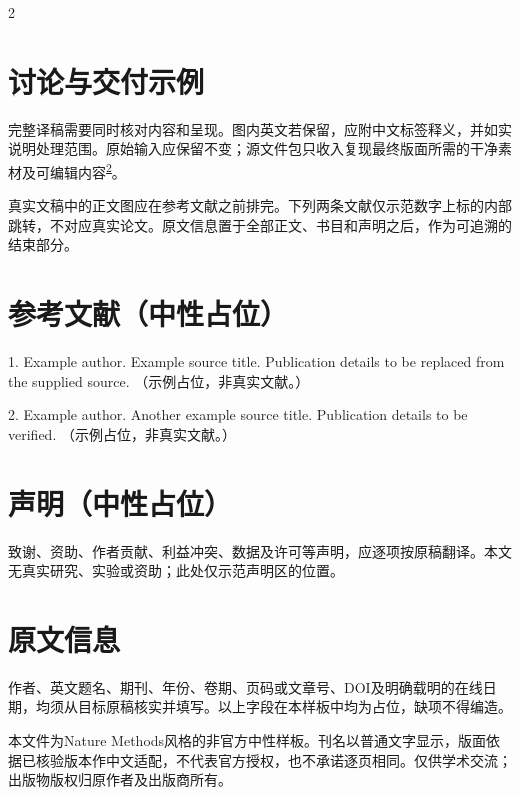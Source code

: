 \documentclass[UTF8,fontset=none,scheme=plain]{ctexart}
\newcommand{\MethodsCite}[1]{\textsuperscript{\hyperlink{ref:#1}{#1}}}
\newenvironment{methodscols}{\begin{multicols}{2}}{\end{multicols}}
\begin{document}
\clearpage
\begin{center}\begin{minipage}{.78\textwidth}\DemoVector\end{minipage}\end{center}
\par\vspace{11bp}
\begin{methodscols}
\section*{讨论与交付示例}
完整译稿需要同时核对内容和呈现。图内英文若保留，应附中文标签释义，并如实说明处理范围。原始输入应保留不变；源文件包只收入复现最终版面所需的干净素材及可编辑内容\MethodsCite{2}。

真实文稿中的正文图应在参考文献之前排完。下列两条文献仅示范数字上标的内部跳转，不对应真实论文。原文信息置于全部正文、书目和声明之后，作为可追溯的结束部分。
\section*{参考文献（中性占位）}
{\fontsize{7.6bp}{10bp}\selectfont\setlength{\parindent}{0pt}
\hypertarget{ref:1}{}1. Example author. Example source title. Publication details to be replaced from the supplied source. （示例占位，非真实文献。）\par\smallskip
\hypertarget{ref:2}{}2. Example author. Another example source title. Publication details to be verified. （示例占位，非真实文献。）\par}
\section*{声明（中性占位）}
致谢、资助、作者贡献、利益冲突、数据及许可等声明，应逐项按原稿翻译。本文无真实研究、实验或资助；此处仅示范声明区的位置。
\section*{原文信息}
作者、英文题名、期刊、年份、卷期、页码或文章号、DOI及明确载明的在线日期，均须从目标原稿核实并填写。以上字段在本样板中均为占位，缺项不得编造。

本文件为Nature Methods风格的非官方中性样板。刊名以普通文字显示，版面依据已核验版本作中文适配，不代表官方授权，也不承诺逐页相同。仅供学术交流；出版物版权归原作者及出版商所有。
\end{methodscols}
\end{document}
